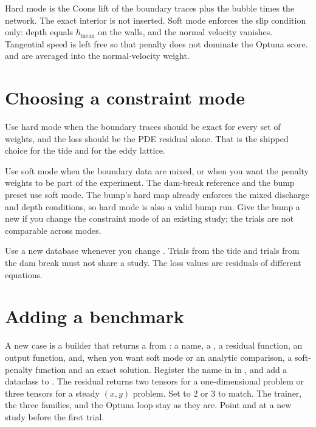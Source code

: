 Hard mode is the Coons lift of the boundary traces plus the bubble times the network.
The exact interior is not inserted.
Soft mode enforces the slip condition only: depth equals \(h_{\mathrm{mean}}\) on the walls, and the normal velocity vanishes.
Tangential speed is left free so that penalty does not dominate the Optuna score.
 and  are averaged into the normal-velocity weight.

\section{Choosing a constraint mode}

Use hard mode when the boundary traces should be exact for every set of weights, and the loss should be the PDE residual alone.
That is the shipped choice for the tide and for the eddy lattice.

Use soft mode when the boundary data are mixed, or when you want the penalty weights to be part of the experiment.
The dam-break reference and the bump preset use soft mode.
The bump's hard map already enforces the mixed discharge and depth conditions, so hard mode is also a valid bump run.
Give the bump a new  if you change the constraint mode of an existing study; the trials are not comparable across modes.

Use a new database whenever you change .
Trials from the tide and trials from the dam break must not share a study.
The loss values are residuals of different equations.

\section{Adding a benchmark}
\label{sec:new-problem}

A new case is a builder that returns a  from : a name, a , a residual function, an output function, and, when you want soft mode or an analytic comparison, a soft-penalty function and an exact solution.
Register the name in  in , and add a dataclass to .
The residual returns two tensors for a one-dimensional problem or three tensors for a steady \((x,y)\) problem.
Set  to 2 or 3 to match.
The trainer, the three families, and the Optuna loop stay as they are.
Point  and  at a new study before the first trial.
